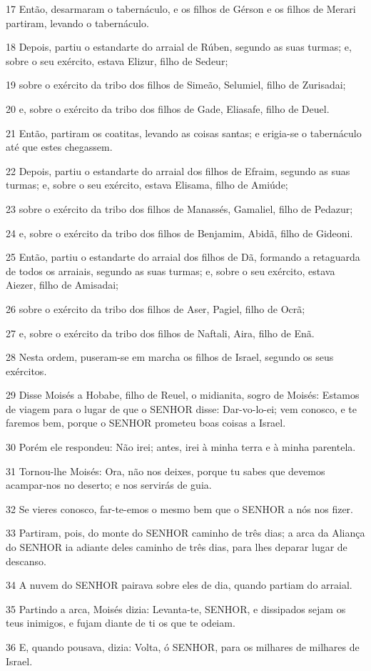 \par 17 Então, desarmaram o tabernáculo, e os filhos de Gérson e os filhos de Merari partiram, levando o tabernáculo.
\par 18 Depois, partiu o estandarte do arraial de Rúben, segundo as suas turmas; e, sobre o seu exército, estava Elizur, filho de Sedeur;
\par 19 sobre o exército da tribo dos filhos de Simeão, Selumiel, filho de Zurisadai;
\par 20 e, sobre o exército da tribo dos filhos de Gade, Eliasafe, filho de Deuel.
\par 21 Então, partiram os coatitas, levando as coisas santas; e erigia-se o tabernáculo até que estes chegassem.
\par 22 Depois, partiu o estandarte do arraial dos filhos de Efraim, segundo as suas turmas; e, sobre o seu exército, estava Elisama, filho de Amiúde;
\par 23 sobre o exército da tribo dos filhos de Manassés, Gamaliel, filho de Pedazur;
\par 24 e, sobre o exército da tribo dos filhos de Benjamim, Abidã, filho de Gideoni.
\par 25 Então, partiu o estandarte do arraial dos filhos de Dã, formando a retaguarda de todos os arraiais, segundo as suas turmas; e, sobre o seu exército, estava Aiezer, filho de Amisadai;
\par 26 sobre o exército da tribo dos filhos de Aser, Pagiel, filho de Ocrã;
\par 27 e, sobre o exército da tribo dos filhos de Naftali, Aira, filho de Enã.
\par 28 Nesta ordem, puseram-se em marcha os filhos de Israel, segundo os seus exércitos.
\par 29 Disse Moisés a Hobabe, filho de Reuel, o midianita, sogro de Moisés: Estamos de viagem para o lugar de que o SENHOR disse: Dar-vo-lo-ei; vem conosco, e te faremos bem, porque o SENHOR prometeu boas coisas a Israel.
\par 30 Porém ele respondeu: Não irei; antes, irei à minha terra e à minha parentela.
\par 31 Tornou-lhe Moisés: Ora, não nos deixes, porque tu sabes que devemos acampar-nos no deserto; e nos servirás de guia.
\par 32 Se vieres conosco, far-te-emos o mesmo bem que o SENHOR a nós nos fizer.
\par 33 Partiram, pois, do monte do SENHOR caminho de três dias; a arca da Aliança do SENHOR ia adiante deles caminho de três dias, para lhes deparar lugar de descanso.
\par 34 A nuvem do SENHOR pairava sobre eles de dia, quando partiam do arraial.
\par 35 Partindo a arca, Moisés dizia: Levanta-te, SENHOR, e dissipados sejam os teus inimigos, e fujam diante de ti os que te odeiam.
\par 36 E, quando pousava, dizia: Volta, ó SENHOR, para os milhares de milhares de Israel.

